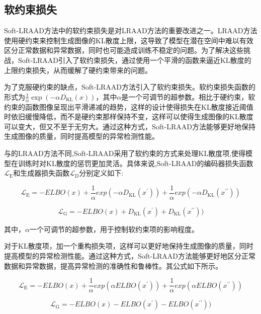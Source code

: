 \documentclass{article}
\begin{document}
\subsection{软约束损失}

Soft-LRAAD方法中的软约束损失是对LRAAD方法的重要改进之一。LRAAD方法使用硬约束来控制生成图像的KL散度上限，这导致了模型在潜在空间中难以有效区分正常数据和异常数据，同时也可能造成训练不稳定的问题。为了解决这些挑战，Soft-LRAAD引入了软约束损失，通过使用一个平滑的函数来逼近KL散度的上限约束损失，从而缓解了硬约束带来的问题。

为了克服硬约束的缺点，Soft-LRAAD方法引入了软约束损失。软约束损失函数的形式为$\frac{1}{\alpha}\exp(- \alpha D_{\mathrm{KL}}(x))$，其中$\alpha$是一个可调节的超参数。相比于硬约束，软约束的函数图像呈现出平滑递减的趋势，这样的设计使得损失在KL散度接近阈值时依旧缓慢降低，而不是硬约束那样保持不变，这样可以使得生成图像的KL散度可以变大，但又不至于无穷大。通过这种方式，Soft-LRAAD方法能够更好地保持生成图像的质量，同时提高模型的异常检测性能。

与的LRAAD方法不同,Soft-LRAAD采用了软约束的方式来处理KL散度项,使得模型在训练时对KL散度的惩罚更加灵活。具体来说,Soft-LRAAD的编码器损失函数$\mathcal{L}_{\mathrm{E}}$和生成器损失函数$\mathcal{L}_{\mathrm{D}}$分别定义如下:

\begin{equation}
  \mathcal{L}_{\mathrm{E}}=-ELBO(x) + \frac{1}{\alpha}exp(- \alpha D_{\mathrm{KL}}(x^\prime)) + \frac{1}{\alpha}exp(-\alpha D_{\mathrm{KL}}(x^{\prime\prime}))
\end{equation}

\begin{equation}
  \mathcal{L}_{\text {G}}=-ELBO(x) + D_\mathrm{KL}(x^\prime) + D_\mathrm{KL}(x^{\prime\prime}))
\end{equation}

其中，$\alpha$一个可调节的超参数，用于控制软约束项的影响程度。

对于KL散度项，加一个重构损失项，这样可以更好地保持生成图像的质量，同时提高模型的异常检测性能。通过这种方式，Soft-LRAAD方法能够更好地区分正常数据和异常数据，提高异常检测的准确性和鲁棒性。其公式如下所示。

\begin{equation} \label{eq:encoder_loss}
  \mathcal{L}_{\mathrm{E}}=-ELBO(x) + \frac{1}{\alpha}exp(\alpha ELBO(x^\prime)) + \frac{1}{\alpha}exp(\alpha ELBO(x^{\prime\prime}))
\end{equation}

\begin{equation} \label{eq:decoder_loss}
  \mathcal{L}_{\text {G}}=-ELBO(x) - ELBO(x^\prime) - ELBO(x^{\prime\prime}))
\end{equation}
\end{document}
